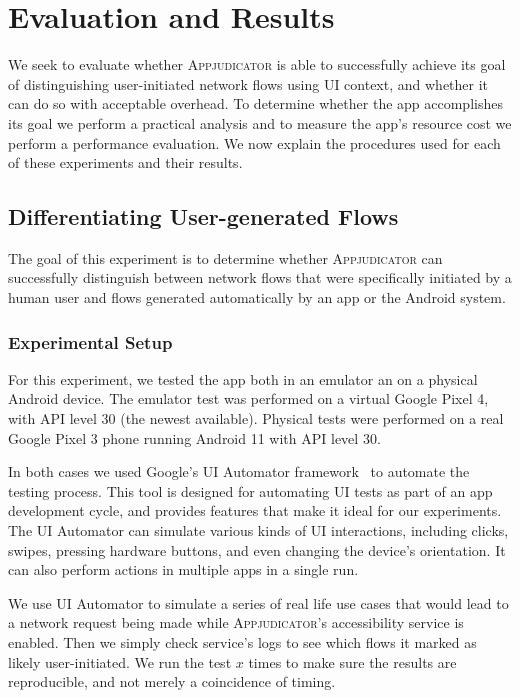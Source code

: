 \section{Evaluation and Results}
\label{sec:evaluation-and-results}

We seek to evaluate whether \textsc{Appjudicator} is able to successfully
achieve its goal of distinguishing user-initiated network flows using UI
context, and whether it can do so with acceptable overhead. To determine whether
the app accomplishes its goal we perform a practical analysis and to measure the
app's resource cost we perform a performance evaluation. We now explain the
procedures used for each of these experiments and their results.

\subsection{Differentiating User-generated Flows}
\label{sec:differentiating-user-generated-flows}

The goal of this experiment is to determine whether \textsc{Appjudicator} can
successfully distinguish between network flows that were specifically initiated
by a human user and flows generated automatically by an app or the Android
system.

\subsubsection{Experimental Setup}
\label{sec:experimental-setup}

For this experiment, we tested the app both in an emulator an on a physical
Android device. The emulator test was performed on a virtual Google Pixel 4,
with API level 30 (the newest available). Physical tests were performed on a
real Google Pixel 3 phone running Android 11 with API level 30.

In both cases we used Google's UI Automator framework~\cite{uiautomator2020} to
automate the testing process. This tool is designed for automating UI tests as
part of an app development cycle, and provides features that make it ideal for
our experiments. The UI Automator can simulate various kinds of UI interactions,
including clicks, swipes, pressing hardware buttons, and even changing the
device's orientation. It can also perform actions in multiple apps in a single
run.

We use UI Automator to simulate a series of real life use cases that would lead
to a network request being made while \textsc{Appjudicator}'s accessibility
service is enabled. Then we simply check service's logs to see which flows it
marked as likely user-initiated. We run the test $x$ times to make sure the
results are reproducible, and not merely a coincidence of timing.

